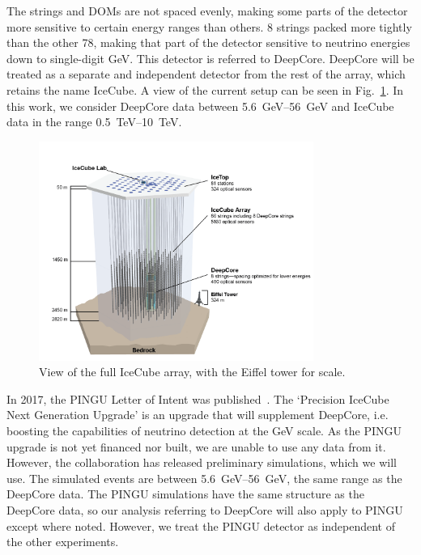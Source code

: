 The strings and DOMs are not spaced evenly, making some parts of the detector more sensitive to certain energy ranges than others.
8 strings packed more tightly than the other 78, making that part of the detector sensitive to neutrino energies down to single-digit \si{\GeV}. This detector is referred to DeepCore. 
DeepCore will be treated as a separate and independent detector from the rest of the array, which
retains the name IceCube. A view of the current setup can be seen in Fig.~\ref{fig:array}. In this work, we consider DeepCore data between \SIrange{5.6}{56}{\GeV} and IceCube data in the range \SIrange{0.5}{10}{\TeV}.
\begin{figure}
    \centering
    \includegraphics[width=0.8\textwidth]{figures/icecube2.png}
    \caption{View of the full IceCube array, with the Eiffel tower for scale.}\label{fig:array}
\end{figure}

In 2017, the PINGU Letter of Intent was published~\cite{PINGUletter}. The `Precision IceCube Next Generation Upgrade' is an upgrade that will 
supplement DeepCore, i.e. boosting the capabilities of neutrino detection at the \si{\GeV} scale. As the PINGU upgrade is not yet financed nor built, we are
unable to use any data from it. However, the collaboration has released preliminary simulations, which we will use. The simulated events 
are between \SIrange{5.6}{56}{\GeV}, the same range as the DeepCore data.
The PINGU simulations have the same structure as the DeepCore data, so our analysis referring to DeepCore will
also apply to PINGU except where noted. However, we treat the PINGU detector as independent of the other experiments.


